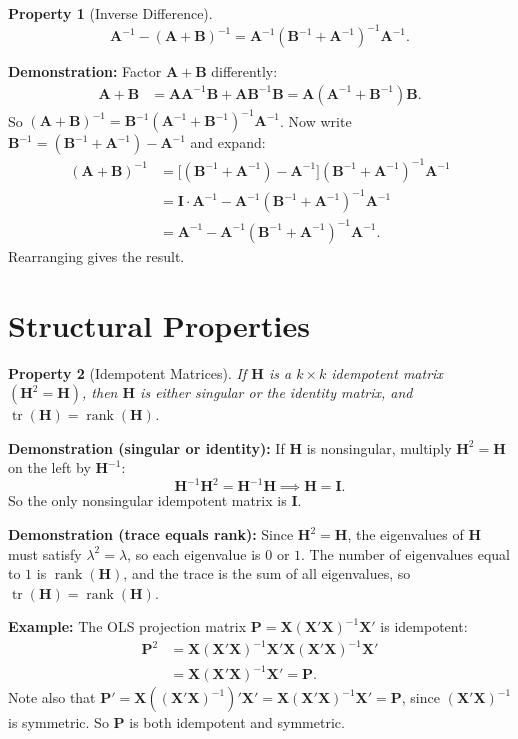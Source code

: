 \documentclass[11pt]{article}
\newtheorem{property}{Property}
\newcommand{\Ainv}{\bm{A}^{-1}}
\newcommand{\Binv}{\bm{B}^{-1}}
\newcommand{\A}{\bm{A}}
\newcommand{\B}{\bm{B}}
\newcommand{\I}{\bm{I}}
\newcommand{\tr}{\operatorname{tr}}
\newcommand{\rank}{\operatorname{rank}}
\begin{document}
\begin{property}[Inverse Difference]
\[
\Ainv - (\A+\B)^{-1} = \Ainv(\Binv + \Ainv)^{-1}\Ainv.
\]
\end{property}

\textbf{Demonstration:} Factor $\A + \B$ differently:
\begin{align*}
\A + \B &= \A\Ainv\B + \A\Binv\B = \A(\Ainv + \Binv)\B.
\end{align*}
So $(\A+\B)^{-1} = \Binv(\Ainv+\Binv)^{-1}\Ainv$. Now write $\Binv = (\Binv + \Ainv) - \Ainv$ and expand:
\begin{align*}
(\A+\B)^{-1} &= \bigl[(\Binv+\Ainv) - \Ainv\bigr](\Binv+\Ainv)^{-1}\Ainv \\
              &= \I\cdot\Ainv - \Ainv(\Binv+\Ainv)^{-1}\Ainv \\
              &= \Ainv - \Ainv(\Binv+\Ainv)^{-1}\Ainv.
\end{align*}
Rearranging gives the result.

\section*{Structural Properties}

\begin{property}[Idempotent Matrices]
If $\bm{H}$ is a $k\times k$ idempotent matrix $(\bm{H}^2 = \bm{H})$, then $\bm{H}$ is either singular or the identity matrix, and $\tr(\bm{H}) = \rank(\bm{H})$.
\end{property}

\textbf{Demonstration (singular or identity):} If $\bm{H}$ is nonsingular, multiply $\bm{H}^2 = \bm{H}$ on the left by $\bm{H}^{-1}$:
\[
\bm{H}^{-1}\bm{H}^2 = \bm{H}^{-1}\bm{H} \implies \bm{H} = \I.
\]
So the only nonsingular idempotent matrix is $\I$.

\medskip

\textbf{Demonstration (trace equals rank):} Since $\bm{H}^2 = \bm{H}$, the eigenvalues of $\bm{H}$ must satisfy $\lambda^2 = \lambda$, so each eigenvalue is $0$ or $1$. The number of eigenvalues equal to $1$ is $\rank(\bm{H})$, and the trace is the sum of all eigenvalues, so $\tr(\bm{H}) = \rank(\bm{H})$.

\medskip

\textbf{Example:} The OLS projection matrix $\bm{P} = \bm{X}(\bm{X}'\bm{X})^{-1}\bm{X}'$ is idempotent:
\begin{align*}
\bm{P}^2 &= \bm{X}(\bm{X}'\bm{X})^{-1}\bm{X}'\bm{X}(\bm{X}'\bm{X})^{-1}\bm{X}' \\
          &= \bm{X}(\bm{X}'\bm{X})^{-1}\bm{X}' = \bm{P}.
\end{align*}
Note also that $\bm{P}' = \bm{X}((\bm{X}'\bm{X})^{-1})'\bm{X}' = \bm{X}(\bm{X}'\bm{X})^{-1}\bm{X}' = \bm{P}$, since $(\bm{X}'\bm{X})^{-1}$ is symmetric. So $\bm{P}$ is both idempotent and symmetric.
\end{document}

